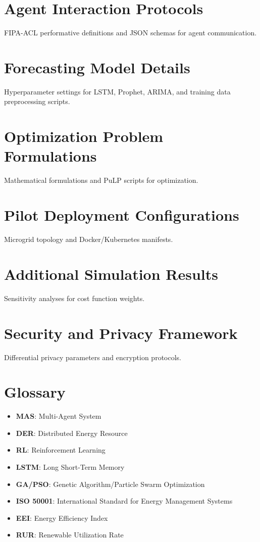 \documentclass[12pt, a4paper, oneside]{book}
\begin{document}
\begin{appendices}
\chapter{Agent Interaction Protocols}
FIPA-ACL performative definitions and JSON schemas for agent communication.

\chapter{Forecasting Model Details}
Hyperparameter settings for LSTM, Prophet, ARIMA, and training data preprocessing scripts.

\chapter{Optimization Problem Formulations}
Mathematical formulations and PuLP scripts for optimization.

\chapter{Pilot Deployment Configurations}
Microgrid topology and Docker/Kubernetes manifests.

\chapter{Additional Simulation Results}
Sensitivity analyses for cost function weights.

\chapter{Security and Privacy Framework}
Differential privacy parameters and encryption protocols.

\chapter{Glossary}
\begin{itemize}
    \item \textbf{MAS}: Multi-Agent System
    \item \textbf{DER}: Distributed Energy Resource
    \item \textbf{RL}: Reinforcement Learning
    \item \textbf{LSTM}: Long Short-Term Memory
    \item \textbf{GA/PSO}: Genetic Algorithm/Particle Swarm Optimization
    \item \textbf{ISO 50001}: International Standard for Energy Management Systems
    \item \textbf{EEI}: Energy Efficiency Index
    \item \textbf{RUR}: Renewable Utilization Rate
\end{itemize}
\end{appendices}
\end{document}
